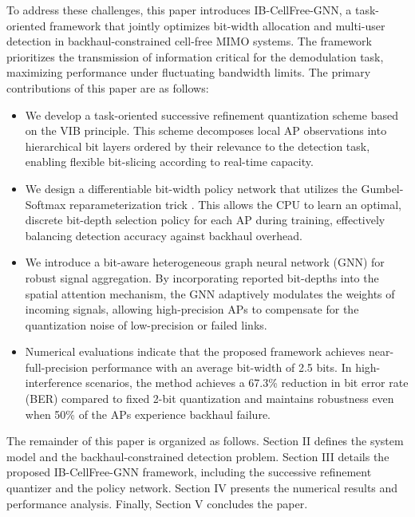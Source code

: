 To address these challenges, this paper introduces IB-CellFree-GNN, a task-oriented framework that jointly optimizes bit-width allocation and multi-user detection in backhaul-constrained cell-free MIMO systems. The framework prioritizes the transmission of information critical for the demodulation task, maximizing performance under fluctuating bandwidth limits. The primary contributions of this paper are as follows:
\begin{itemize}
    \item We develop a task-oriented successive refinement quantization scheme based on the VIB principle. This scheme decomposes local AP observations into hierarchical bit layers ordered by their relevance to the detection task, enabling flexible bit-slicing according to real-time capacity.
    \item We design a differentiable bit-width policy network that utilizes the Gumbel-Softmax reparameterization trick \cite{lyu2025joint}. This allows the CPU to learn an optimal, discrete bit-depth selection policy for each AP during training, effectively balancing detection accuracy against backhaul overhead.
    \item We introduce a bit-aware heterogeneous graph neural network (GNN) for robust signal aggregation. By incorporating reported bit-depths into the spatial attention mechanism, the GNN adaptively modulates the weights of incoming signals, allowing high-precision APs to compensate for the quantization noise of low-precision or failed links.
    \item Numerical evaluations indicate that the proposed framework achieves near-full-precision performance with an average bit-width of 2.5 bits. In high-interference scenarios, the method achieves a 67.3\% reduction in bit error rate (BER) compared to fixed 2-bit quantization and maintains robustness even when 50\% of the APs experience backhaul failure.
\end{itemize}

The remainder of this paper is organized as follows. Section II defines the system model and the backhaul-constrained detection problem. Section III details the proposed IB-CellFree-GNN framework, including the successive refinement quantizer and the policy network. Section IV presents the numerical results and performance analysis. Finally, Section V concludes the paper.